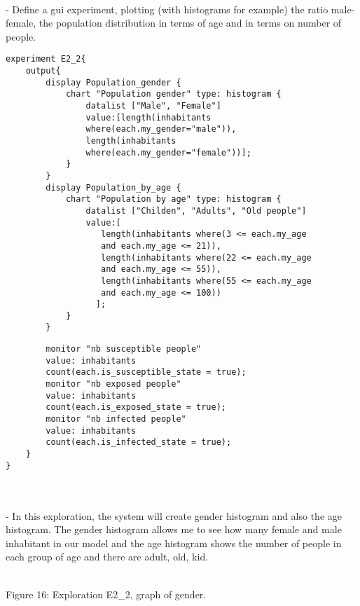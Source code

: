 \documentclass{article}
\begin{document}
\begin{pic15}
\begin{pic15}
\\- Define a gui experiment, plotting (with histograms for example) the ratio male-female, the population distribution in terms of age and in terms on number of people.
\newline\newline
\begin{tcolorbox}
\begin{lstlisting}
experiment E2_2{
	output{
		display Population_gender {
			chart "Population gender" type: histogram {
				datalist ["Male", "Female"] 
				value:[length(inhabitants 
				where(each.my_gender="male")), 
				length(inhabitants 
				where(each.my_gender="female"))];
			}								
		}
		display Population_by_age {
			chart "Population by age" type: histogram {
				datalist ["Childen", "Adults", "Old people"] 
				value:[
				   length(inhabitants where(3 <= each.my_age 
				   and each.my_age <= 21)),
				   length(inhabitants where(22 <= each.my_age 
				   and each.my_age <= 55)), 
				   length(inhabitants where(55 <= each.my_age 
				   and each.my_age <= 100))
				  ];
			}
		}
\end{lstlisting}
\end{tcolorbox}
\begin{tcolorbox}
\begin{lstlisting}
		monitor "nb susceptible people" 
		value: inhabitants 
		count(each.is_susceptible_state = true);
		monitor "nb exposed people" 
		value: inhabitants 
		count(each.is_exposed_state = true);
		monitor "nb infected people" 
		value: inhabitants 
		count(each.is_infected_state = true);
	}
}
\end{lstlisting}
\end{tcolorbox}
\\
\\- In this exploration, the system will create gender histogram and also the age histogram. The gender histogram allows me to see how many female and male inhabitant in our model and the age histogram shows the number of people in each group of age and there are adult, old, kid.
\\
\begin{pic16}
\\
\caption{Figure 16: Exploration E2\_2, graph of gender.} 
\end{pic16}
\\
\begin{pic17}
\\

\end{pic17}
\end{pic15}
\end{pic15}
\end{document}
